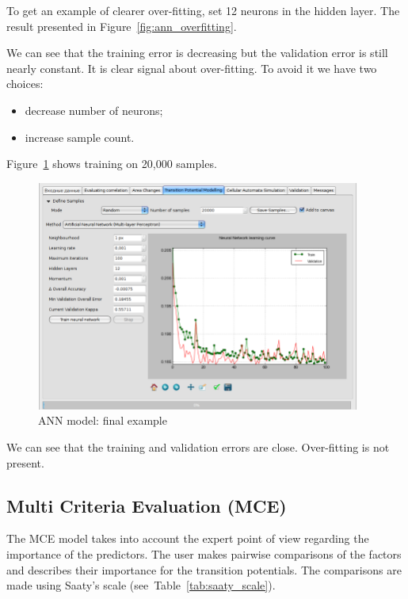 \documentclass{report}
\begin{document}
To get an example of clearer over-fitting, set 12 neurons in the hidden layer. 
The result presented in Figure~\ref{fig:ann_overfitting}.

We can see that the training error is decreasing but the validation error is still nearly constant. It is clear signal about over-fitting.
To avoid it we have two choices:
\begin{itemize}
    \item decrease number of neurons;
    \item increase sample count.
\end{itemize}

Figure~\ref{fig:ann_final} shows training on 20,000 samples.

\begin{figure}[h!]
\centering
\includegraphics[width=0.95\textwidth]{img/ann_final.png}
\caption{ANN model: final example}
\label{fig:ann_final}
\end{figure}

We can see that the training and validation errors are close. Over-fitting is not present.

\subsection{Multi Criteria Evaluation (MCE)}

The MCE model \cite{eastman1999multi} takes into account the expert point of view regarding the importance of the predictors. 
The user makes pairwise comparisons of the factors and describes their importance for the transition potentials. 
The comparisons are made using Saaty's scale (see~Table~\ref{tab:saaty_scale}).
\end{document}
